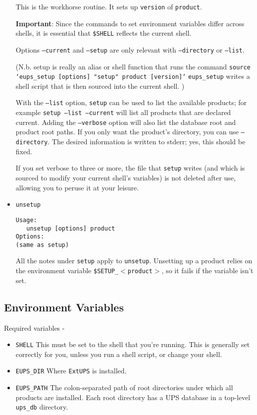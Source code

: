 \documentclass{article}
\newcommand{\code}[1]{\texttt{#1}}
\newcommand{\eups}{\code{ExtUPS}}
\begin{document}
\begin{itemize}
This is the workhorse routine. It sets up \code{version} of \code{product}.

\textbf{Important}: Since the commands to set environment variables differ across shells,
it is essential that \code{\$SHELL} reflects the current shell.

Options \code{--current} and \code{--setup} are only relevant with \code{--directory}
or \code{--list}.

(N.b. setup is really an alias or shell function that runs the command\hfil\break
\code{source `eups\_setup [options] "setup" product [version]`}\hfil\break
\code{eups\_setup} writes a shell script that is then sourced into the
current shell.
)

With the \code{--list} option, \code{setup} can be used to list the available
products; for example \code{setup --list --current} will list all products that
are declared current. Adding the \code{--verbose} option will also
list the database root and product root paths.  If you only want the product's
directory, you can use \code{--directory}. The desired information is written
to stderr; yes, this should be fixed.

If you set verbose to three or more, the file that \code{setup} writes (and
which is sourced to modify your current shell's variables) is not deleted
after use, allowing you to peruse it at your leisure.


\item \code{unsetup}
\begin{verbatim}
Usage:
   unsetup [options] product
Options:
(same as setup)
\end{verbatim}
  
All the notes under \code{setup} apply to
\code{unsetup}. Unsetting up a product relies on the environment
variable \code{\$SETUP\_$<$product$>$}, so it fails if the variable
isn't set.

\end{itemize}

\subsection{Environment Variables}

Required variables -

\begin{itemize}
  \item \code{SHELL}
    This must be set to the shell that you're running. This is
    generally set correctly for you, unless you run a shell script, or
    change your shell.

  \item \code{EUPS\_DIR}
    Where \eups{} is installed.

  \item \code{EUPS\_PATH}
    The colon-separated path of root directories under which all products are installed.
    Each root directory has a UPS database in a top-level \code{ups\_db} directory.
\end{itemize}
\end{document}
